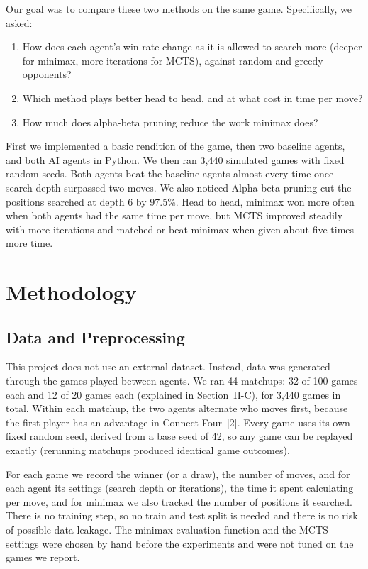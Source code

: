 \documentclass[10pt,twocolumn,letterpaper]{article}
\begin{document}
Our goal was to compare these two methods on the same game. Specifically, we asked:
\begin{enumerate}[leftmargin=*,nosep]
  \item How does each agent's win rate change as it is allowed to search more (deeper for
        minimax, more iterations for MCTS), against random and greedy opponents?
  \item Which method plays better head to head, and at what cost in time per move?
  \item How much does alpha-beta pruning reduce the work minimax does?
\end{enumerate}

First we implemented a basic rendition of the game, then two baseline agents, and both AI agents in Python. We then ran 3,440
simulated games with fixed random seeds. Both agents beat the baseline agents almost every time once search depth surpassed two moves. 
We also noticed Alpha-beta pruning cut the positions searched at depth 6 by 97.5\%.
Head to head, minimax won more often when both agents had the same time per move, but MCTS
improved steadily with more iterations and matched or beat minimax when given about five
times more time.

\section{Methodology}

\subsection{Data and Preprocessing}

This project does not use an external dataset. Instead, data was generated through the games played
between agents. We ran 44 matchups: 32 of 100 games each and 12 of 20 games each (explained in Section~II-C), for 3,440 games in total. Within
each matchup, the two agents alternate who moves first, because the first player has an
advantage in Connect Four~[2]. Every game uses its own fixed random seed, derived from a base
seed of 42, so any game can be replayed exactly (rerunning matchups produced identical game
outcomes).

For each game we record the winner (or a draw), the number of moves, and for each agent its
settings (search depth or iterations), the time it spent calculating per move, and for minimax we also tracked the
number of positions it searched. There is no training step, so no train and test split is
needed and there is no risk of possible data leakage. The minimax evaluation function and the MCTS
settings were chosen by hand before the experiments and were not tuned on the games we
report.
\end{document}
